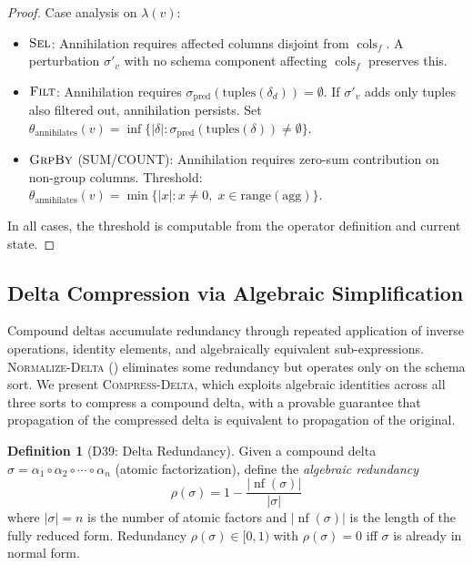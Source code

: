 \documentclass[11pt,a4paper]{article}
\theoremstyle{definition}
\newtheorem{definition}[theorem]{Definition}
\newcommand{\ann}{\mathrm{annihilates}}
\DeclareMathOperator{\nf}{nf}
\DeclareMathOperator{\cols}{cols}
\begin{document}
\begin{proof}
Case analysis on $\lambda(v)$:
\begin{itemize}[nosep]
  \item $\textsc{Sel}$: Annihilation requires affected columns disjoint from
    $\cols_f$.  A perturbation $\sigma'_v$ with no schema component affecting
    $\cols_f$ preserves this.
  \item $\textsc{Filt}$: Annihilation requires
    $\sigma_{\mathrm{pred}}(\mathrm{tuples}(\delta_d)) = \emptyset$.
    If $\sigma'_v$ adds only tuples also filtered out, annihilation persists.
    Set $\theta_{\ann}(v) = \inf\{|\delta| : \sigma_{\mathrm{pred}}(
    \mathrm{tuples}(\delta)) \neq \emptyset\}$.
  \item $\textsc{GrpBy}$ (SUM/COUNT): Annihilation requires zero-sum
    contribution on non-group columns.  Threshold:
    $\theta_{\ann}(v) = \min\{|x| : x \neq 0,\; x \in
    \mathrm{range}(\mathrm{agg})\}$.
\end{itemize}
In all cases, the threshold is computable from the operator definition and
current state.
\end{proof}


\subsection{Delta Compression via Algebraic Simplification}
\label{sec:compress-delta}

Compound deltas accumulate redundancy through repeated application of inverse
operations, identity elements, and algebraically equivalent sub-expressions.
\textsc{Normalize-Delta} () eliminates some
redundancy but operates only on the schema sort.  We present
\textsc{Compress-Delta}, which exploits algebraic identities across all three
sorts to compress a compound delta, with a provable guarantee that propagation
of the compressed delta is equivalent to propagation of the original.

\begin{definition}[D39: Delta Redundancy]\label{def:delta-redundancy}
Given a compound delta $\sigma = \alpha_1 \circ \alpha_2 \circ \cdots \circ
\alpha_n$ (atomic factorization), define the \emph{algebraic redundancy}
\[
  \rho(\sigma) = 1 - \frac{|\nf(\sigma)|}{|\sigma|}
\]
where $|\sigma| = n$ is the number of atomic factors and $|\nf(\sigma)|$ is the
length of the fully reduced form.  Redundancy $\rho(\sigma) \in [0, 1)$ with
$\rho(\sigma) = 0$ iff $\sigma$ is already in normal form.
\end{definition}
\end{document}
